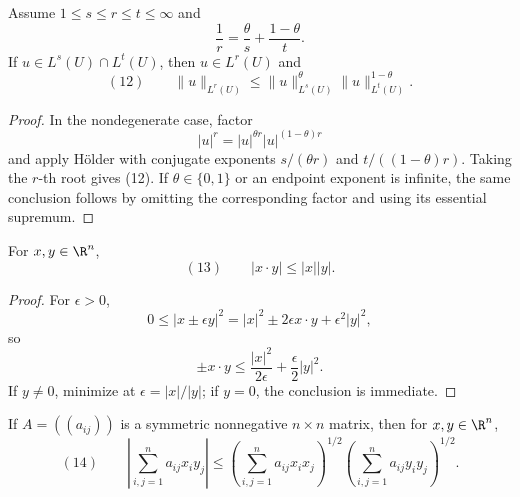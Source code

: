 \begin{lemma}
\label{lem:interpolation-inequality-lp-norms}
Assume $1\leq s\leq r\leq t\leq\infty$ and
\[
\frac1r=\frac\theta s+\frac{1-\theta}{t}.
\]
If $u\in L^s(U)\cap L^t(U)$, then $u\in L^r(U)$ and
\[
(12)\qquad
\|u\|_{L^r(U)}
\leq\|u\|_{L^s(U)}^\theta
\|u\|_{L^t(U)}^{1-\theta}.
\]
\end{lemma}
\begin{proof}
\sketch In the nondegenerate case, factor
\[
|u|^r=|u|^{\theta r}|u|^{(1-\theta)r}
\]
and apply H\"older with conjugate exponents $s/(\theta r)$ and $t/((1-\theta)r)$. Taking the $r$-th root gives (12). If $\theta\in\{0,1\}$ or an endpoint exponent is infinite, the same conclusion follows by omitting the corresponding factor and using its essential supremum.
\end{proof}

\begin{lemma}
\label{lem:cauchy-schwarz-inequality}
For $x,y\in\R^n$,
\[
(13)\qquad |x\cdot y|\leq|x||y|.
\]
\end{lemma}
\begin{proof}
\sketch For $\epsilon>0$,
\[
0\leq|x\pm\epsilon y|^2
=|x|^2\pm2\epsilon x\cdot y+\epsilon^2|y|^2,
\]
so
\[
\pm x\cdot y
\leq\frac{|x|^2}{2\epsilon}+\frac\epsilon2|y|^2.
\]
If $y\ne0$, minimize at $\epsilon=|x|/|y|$; if $y=0$, the conclusion is immediate.
\end{proof}

\begin{remark}
\label{rem:cauchy-schwarz-matrix-form}
If $A=((a_{ij}))$ is a symmetric nonnegative $n\times n$ matrix, then for $x,y\in\R^n$,
\[
(14)\qquad
\left|\sum_{i,j=1}^na_{ij}x_iy_j\right|
\leq
\left(\sum_{i,j=1}^na_{ij}x_ix_j\right)^{1/2}
\left(\sum_{i,j=1}^na_{ij}y_iy_j\right)^{1/2}.
\]
\end{remark}

